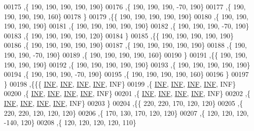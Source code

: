 \begin{DoxyCode}
00175   ,\{   190,   190,   190,   190,   190\}
00176   ,\{   190,   190,   190,   -70,   190\}
00177   ,\{   190,   190,   190,   190,   160\}
00178   \}
00179  ,\{\{   190,   190,   190,   190,   190\}
00180   ,\{   190,   190,   190,   190,   190\}
00181   ,\{   190,   190,   190,   190,   190\}
00182   ,\{   190,   190,   190,   -70,   190\}
00183   ,\{   190,   190,   190,   190,   120\}
00184   \}
00185  ,\{\{   190,   190,   190,   190,   190\}
00186   ,\{   190,   190,   190,   190,   190\}
00187   ,\{   190,   190,   190,   190,   190\}
00188   ,\{   190,   190,   190,   -70,   190\}
00189   ,\{   190,   190,   190,   190,   160\}
00190   \}
00191  ,\{\{   190,   190,   190,   190,   190\}
00192   ,\{   190,   190,   190,   190,   190\}
00193   ,\{   190,   190,   190,   190,   190\}
00194   ,\{   190,   190,   190,   -70,   190\}
00195   ,\{   190,   190,   190,   190,   160\}
00196   \}
00197  \}
00198 ,\{\{\{   \hyperlink{constants_8h_a12c2040f25d8e3a7b9e1c2024c618cb6}{INF},   \hyperlink{constants_8h_a12c2040f25d8e3a7b9e1c2024c618cb6}{INF},   \hyperlink{constants_8h_a12c2040f25d8e3a7b9e1c2024c618cb6}{INF},   \hyperlink{constants_8h_a12c2040f25d8e3a7b9e1c2024c618cb6}{INF},   INF\}
00199   ,\{   \hyperlink{constants_8h_a12c2040f25d8e3a7b9e1c2024c618cb6}{INF},   \hyperlink{constants_8h_a12c2040f25d8e3a7b9e1c2024c618cb6}{INF},   \hyperlink{constants_8h_a12c2040f25d8e3a7b9e1c2024c618cb6}{INF},   \hyperlink{constants_8h_a12c2040f25d8e3a7b9e1c2024c618cb6}{INF},   INF\}
00200   ,\{   \hyperlink{constants_8h_a12c2040f25d8e3a7b9e1c2024c618cb6}{INF},   \hyperlink{constants_8h_a12c2040f25d8e3a7b9e1c2024c618cb6}{INF},   \hyperlink{constants_8h_a12c2040f25d8e3a7b9e1c2024c618cb6}{INF},   \hyperlink{constants_8h_a12c2040f25d8e3a7b9e1c2024c618cb6}{INF},   INF\}
00201   ,\{   \hyperlink{constants_8h_a12c2040f25d8e3a7b9e1c2024c618cb6}{INF},   \hyperlink{constants_8h_a12c2040f25d8e3a7b9e1c2024c618cb6}{INF},   \hyperlink{constants_8h_a12c2040f25d8e3a7b9e1c2024c618cb6}{INF},   \hyperlink{constants_8h_a12c2040f25d8e3a7b9e1c2024c618cb6}{INF},   INF\}
00202   ,\{   \hyperlink{constants_8h_a12c2040f25d8e3a7b9e1c2024c618cb6}{INF},   \hyperlink{constants_8h_a12c2040f25d8e3a7b9e1c2024c618cb6}{INF},   \hyperlink{constants_8h_a12c2040f25d8e3a7b9e1c2024c618cb6}{INF},   \hyperlink{constants_8h_a12c2040f25d8e3a7b9e1c2024c618cb6}{INF},   INF\}
00203   \}
00204  ,\{\{   220,   220,   170,   120,   120\}
00205   ,\{   220,   220,   120,   120,   120\}
00206   ,\{   170,   130,   170,   120,   120\}
00207   ,\{   120,   120,   120,  -140,   120\}
00208   ,\{   120,   120,   120,   120,   110\}

\end{DoxyCode}
